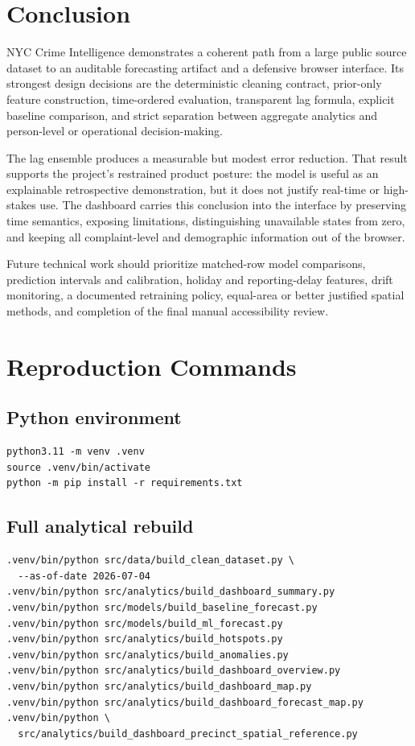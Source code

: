 \documentclass[11pt,oneside]{report}
\begin{document}
\chapter*{Conclusion}

NYC Crime Intelligence demonstrates a coherent path from a large public source
dataset to an auditable forecasting artifact and a defensive browser interface.
Its strongest design decisions are the deterministic cleaning contract,
prior-only feature construction, time-ordered evaluation, transparent lag
formula, explicit baseline comparison, and strict separation between aggregate
analytics and person-level or operational decision-making.

The lag ensemble produces a measurable but modest error reduction. That result
supports the project's restrained product posture: the model is useful as an
explainable retrospective demonstration, but it does not justify real-time or
high-stakes use. The dashboard carries this conclusion into the interface by
preserving time semantics, exposing limitations, distinguishing unavailable
states from zero, and keeping all complaint-level and demographic information
out of the browser.

Future technical work should prioritize matched-row model comparisons,
prediction intervals and calibration, holiday and reporting-delay features,
drift monitoring, a documented retraining policy, equal-area or better justified
spatial methods, and completion of the final manual accessibility review.

\appendix
\chapter{Reproduction Commands}

\section{Python environment}

\begin{verbatim}
python3.11 -m venv .venv
source .venv/bin/activate
python -m pip install -r requirements.txt
\end{verbatim}

\section{Full analytical rebuild}

\begin{verbatim}
.venv/bin/python src/data/build_clean_dataset.py \
  --as-of-date 2026-07-04
.venv/bin/python src/analytics/build_dashboard_summary.py
.venv/bin/python src/models/build_baseline_forecast.py
.venv/bin/python src/models/build_ml_forecast.py
.venv/bin/python src/analytics/build_hotspots.py
.venv/bin/python src/analytics/build_anomalies.py
.venv/bin/python src/analytics/build_dashboard_overview.py
.venv/bin/python src/analytics/build_dashboard_map.py
.venv/bin/python src/analytics/build_dashboard_forecast_map.py
.venv/bin/python \
  src/analytics/build_dashboard_precinct_spatial_reference.py
\end{verbatim}
\end{document}
